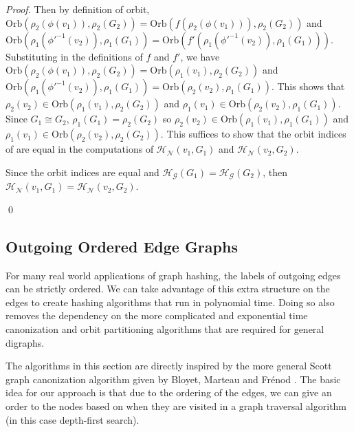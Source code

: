 \documentclass{svproc}
\begin{document}
\begin{proof}
Then by definition of orbit, $\text{Orb}(\rho_2(\phi(v_1)), \rho_2(G_2))=\text{Orb}(f(\rho_2(\phi(v_1))), \rho_2(G_2))$ and $\text{Orb}(\rho_1(\phi'^{-1}(v_2)),\rho_1(G_1)) = \text{Orb}(f'(\rho_1(\phi'^{-1}(v_2)),\rho_1(G_1)))$. Substituting in the definitions of $f$ and $f'$, we have $\text{Orb}(\rho_2(\phi(v_1)), \rho_2(G_2))=\text{Orb}(\rho_1(v_1), \rho_2(G_2))$ and $\text{Orb}(\rho_1(\phi'^{-1}(v_2)),\rho_1(G_1)) = \text{Orb}(\rho_2(v_2),\rho_1(G_1))$. This shows that $\rho_2(v_2) \in \text{Orb}(\rho_1(v_1), \rho_2(G_2))$ and $\rho_1(v_1) \in \text{Orb}(\rho_2(v_2),\rho_1(G_1))$. Since $G_1 \cong G_2$, $\rho_1(G_1)=\rho_2(G_2)$ so $\rho_2(v_2) \in \text{Orb}(\rho_1(v_1), \rho_1(G_1))$ and $\rho_1(v_1) \in \text{Orb}(\rho_2(v_2),\rho_2(G_2))$. This suffices to show that the orbit indices of are equal in the computations of $\mathcal{H_N}(v_1, G_1)$ and $\mathcal{H_N}(v_2, G_2)$.

Since the orbit indices are equal and $\mathcal{H_G}(G_1)=\mathcal{H_G}(G_2)$, then $\mathcal{H_N}(v_1, G_1)=\mathcal{H_N}(v_2, G_2)$.

\qed
\end{proof}

\subsection{Outgoing Ordered Edge Graphs}

For many real world applications of graph hashing, the labels of outgoing edges can be strictly ordered.  We can take advantage of this extra structure on the edges to create hashing algorithms that run in polynomial time. Doing so also removes the dependency on the more complicated and exponential time canonization and orbit partitioning algorithms that are required for general digraphs.

The algorithms in this section are directly inspired by the more general Scott graph canonization algorithm given by Bloyet, Marteau and Fr\'enod \cite{scott}. The basic idea for our approach is that due to the ordering of the edges, we can give an order to the nodes based on when they are visited in a graph traversal algorithm (in this case depth-first search).

\end{document}

